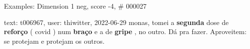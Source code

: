 \begin{frame}{Examples: Dimension 1 neg, score -4, \# 000027}
\footnotesize
\begin{alertblock}{text: t006967, user: thiwitter, 2022-06-29}
monas, tomei a \textbf{segunda} dose de \textbf{reforço} ( covid ) num 
\textbf{braço} e a de \textbf{gripe} , no outro. Dá pra fazer. Aproveitem: se 
protejam e protejam os outros. 
\end{alertblock}
\end{frame}
